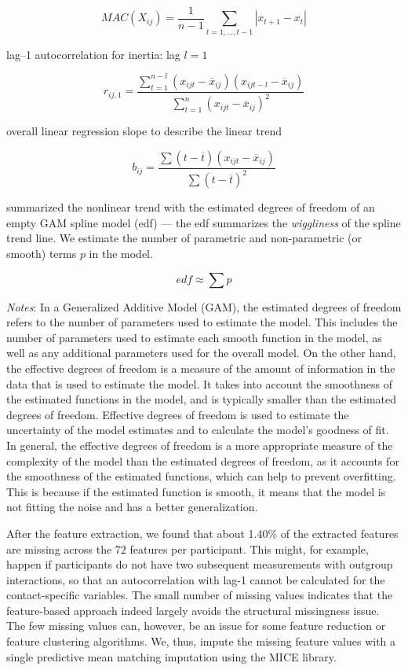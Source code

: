 \begin{equation} \label{eq:mac}
  MAC(X_{ij}) = \frac{1}{n-1} \sum_{t=1, \ldots, t-1}\left|x_{t+1}-x_t\right|
\end{equation}

lag--1 autocorrelation for inertia: lag \(l=1\)

\begin{equation} \label{eq:ar}
  r_{ij,1} = \frac{\sum_{t=1}^{n-l}(x_{ijt}-\overline{x}_{ij})(x_{ijt-l}-\overline{x}_{ij})}{\sum_{t=1}^{n}(x_{ijt}-\overline{x}_{ij})^2}
\end{equation}

overall linear regression slope to describe the linear trend

\begin{equation} \label{eq:lin}
  b_{ij} = \frac{\sum(t-\overline{t})(x_{ijt}-\overline{x}_{ij})}{\sum(t-\overline{t})^2}
\end{equation}

summarized the nonlinear trend with the estimated degrees of freedom of
an empty GAM spline model (edf) --- the edf summarizes the
\textit{wiggliness} of the spline trend line. We estimate the number of
parametric and non-parametric (or smooth) terms \(p\) in the model.

\begin{equation} \label{eq:edf}
  edf \approx \sum p
\end{equation}

\textit{Notes}: In a Generalized Additive Model (GAM), the estimated
degrees of freedom refers to the number of parameters used to estimate
the model. This includes the number of parameters used to estimate each
smooth function in the model, as well as any additional parameters used
for the overall model. On the other hand, the effective degrees of
freedom is a measure of the amount of information in the data that is
used to estimate the model. It takes into account the smoothness of the
estimated functions in the model, and is typically smaller than the
estimated degrees of freedom. Effective degrees of freedom is used to
estimate the uncertainty of the model estimates and to calculate the
model's goodness of fit. In general, the effective degrees of freedom is
a more appropriate measure of the complexity of the model than the
estimated degrees of freedom, as it accounts for the smoothness of the
estimated functions, which can help to prevent overfitting. This is
because if the estimated function is smooth, it means that the model is
not fitting the noise and has a better generalization.

After the feature extraction, we found that about 1.40\% of the
extracted features are missing across the 72 features per participant.
This might, for example, happen if participants do not have two
subsequent measurements with outgroup interactions, so that an
autocorrelation with lag-1 cannot be calculated for the contact-specific
variables. The small number of missing values indicates that the
feature-based approach indeed largely avoids the structural missingness
issue. The few missing values can, however, be an issue for some feature
reduction or feature clustering algorithms. We, thus, impute the missing
feature values with a single predictive mean matching imputation using
the MICE library.
